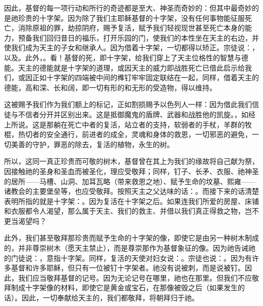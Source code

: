 因此，基督的每一项行动和所行的奇迹都是至大、神圣而奇妙的：但其中最奇妙的是祂珍贵的十字架。因为除了我们主耶稣基督的十字架，没有任何事物能征服死亡，消除原祖的罪，劫掠阴府，赐予复活，赋予我们轻视现世甚至死亡本身的能力，预备我们回归昔日的福乐，打开乐园的门，使我们的本性坐在天主的右边，并使我们成为天主的子女和继承人。因为借着十字架，一切都得以矫正。宗徒说：，以及。此外，。看！基督的死，即十字架，给我们穿上了天主位格性的智慧与德能。天主的德能就是十字架的道理，或因天主的威力即战胜死亡已借此启示给我们，或因正如十字架的四端被中间的榫钉牢牢固定联结在一起，同样，借着天主的德能，高和深、长和阔，即一切有形的和无形的受造物，得以维持。\par

这被赐予我们作为我们额上的标记，正如割损赐予以色列人一样：因为借此我们信徒与不信者分开并区别出来。这是抵御魔鬼的盾牌、武器和战胜他的凯旋。，如经上所说。这是那躺在死亡中者的复活，站立者的支持，软弱者的手杖，羊群的牧棍，热切者的安全通行，前进者的成全，灵魂和身体的救恩，一切邪恶的避免，一切美善的守护，罪恶的除去，复活的植物，永生的树。\par

所以，这同一真正珍贵而可敬的树木，基督曾在其上为我们的缘故将自己献为祭，因接触祂的圣身和圣血而被圣化，理应受敬拜；同样，钉子、长矛、衣服、祂神圣的居所——马槽、山洞、加耳瓦略（带来救恩之地）、赋予生命的坟墓、熙雍——诸教会的主要堡垒等，也应受敬拜。按照天主之父达味的话：。而接下来的话清楚表明所指的就是十字架：。因为复活在十字架之后。如果连我们所爱的房屋、床铺和衣服都令人渴望，那么属于天主、我们的救主、并借以我们真正得救之物，岂不更当渴望吗？\par

此外，我们甚至敬拜那珍贵而赋予生命的十字架的像，即使它是由另一种树木制成的，并非尊崇树木（愿天主禁止），而是尊崇那作为基督象征的像。因为祂告诫祂的门徒说：，意指十字架。同样，复活的天使对妇女说：。宗徒也说：。因为有许多基督和许多耶稣，但只有一位被钉十字架者。祂没有说被刺，而是说被钉。因此，我们应当敬拜基督的记号。因为无论记号在哪里，祂也在那里。但我们不应敬拜制成十字架像的材料，即使它是黄金或宝石，在那像被毁之后（如果发生的话）。因此，一切奉献给天主的，我们都敬拜，将朝拜归于祂。\par


